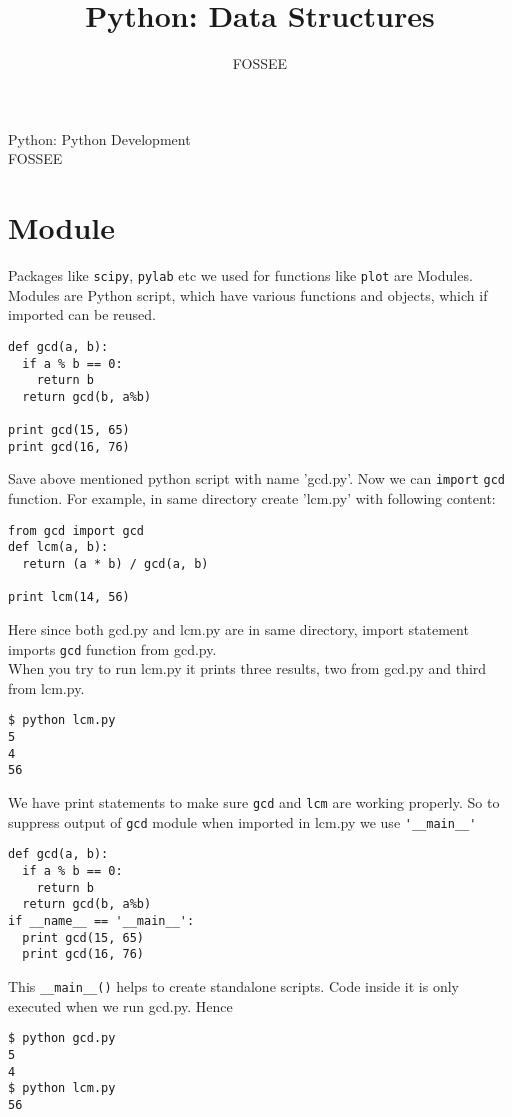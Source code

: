 \documentclass[12pt]{article}
\title{Python: Data Structures}
\author{FOSSEE}
\newcommand{\typ}[1]{\lstinline{#1}}
\begin{document}
\date{}
\vspace{-1in}
\begin{center}
\LARGE{Python: Python Development}\\
\large{FOSSEE}
\end{center}
\section{Module}
Packages like \typ{scipy}, \typ{pylab} etc we used for functions like \typ{plot} are Modules. Modules are Python script, which have various functions and objects, which if imported can be reused. 
\begin{lstlisting}
def gcd(a, b):
  if a % b == 0: 
    return b
  return gcd(b, a%b)

print gcd(15, 65)
print gcd(16, 76)
\end{lstlisting}
Save above mentioned python script with name 'gcd.py'. Now we can \typ{import} \typ{gcd} function. For example, in same directory create 'lcm.py' with following content:
\begin{lstlisting}
from gcd import gcd    
def lcm(a, b):
  return (a * b) / gcd(a, b)
    
print lcm(14, 56)
\end{lstlisting}
Here since both gcd.py and lcm.py are in same directory, import statement imports \typ{gcd} function from gcd.py.\\
When you try to run lcm.py it prints three results, two from gcd.py and third from lcm.py.
\begin{lstlisting}
$ python lcm.py
5
4
56
\end{lstlisting} %
\newpage
We have print statements to make sure \typ{gcd} and \typ{lcm} are working properly. So to suppress output of \typ{gcd} module when imported in lcm.py we use \typ{'__main__'} \
\begin{lstlisting}
def gcd(a, b):
  if a % b == 0: 
    return b
  return gcd(b, a%b)
if __name__ == '__main__':
  print gcd(15, 65)
  print gcd(16, 76)
\end{lstlisting}
This \typ{__main__()} helps to create standalone scripts. Code inside it is only executed when we run gcd.py. Hence
\begin{lstlisting}
$ python gcd.py
5
4
$ python lcm.py 
56
\end{lstlisting}
\end{document}
